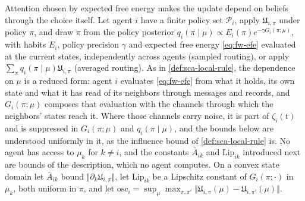 Attention chosen by expected free energy makes the update depend on beliefs through the choice itself. Let agent $i$ have a finite policy set $\mathcal P_i$, apply $\mathfrak U_{i,\pi}$ under policy $\pi$, and draw $\pi$ from the policy posterior $q_i(\pi\mid\mu)\propto E_i(\pi)e^{-\gamma G_i(\pi;\mu)}$, with habits $E_i$, policy precision $\gamma$ and expected free energy \eqref{eq:fw-efe} evaluated at the current states, independently across agents (sampled routing), or apply $\sum_\pi q_i(\pi\mid\mu)\mathfrak U_{i,\pi}$ (averaged routing). As in \cref{def:sca-local-rule}, the dependence on $\mu$ is a reduced form: agent $i$ evaluates \eqref{eq:fw-efe} from what it holds, its own state and what it has read of its neighbors through messages and records, and $G_i(\pi;\mu)$ composes that evaluation with the channels through which the neighbors' states reach it. Where those channels carry noise, it is part of $\zeta_i(t)$ and is suppressed in $G_i(\pi;\mu)$ and $q_i(\pi\mid\mu)$, and the bounds below are understood uniformly in it, as the influence bound of \cref{def:sca-local-rule} is. No agent has access to $\mu_k$ for $k\neq i$, and the constants $\bar A_{ik}$ and $\mathrm{Lip}_{ik}$ introduced next are bounds of the description, which no agent computes. On a convex state domain let $\bar A_{ik}$ bound $\Vert\partial_k\mathfrak U_{i,\pi}\Vert$, let $\mathrm{Lip}_{ik}$ be a Lipschitz constant of $G_i(\pi;\cdot)$ in $\mu_k$, both uniform in $\pi$, and let $\mathrm{osc}_i=\sup_\mu\max_{\pi,\pi'}\Vert\mathfrak U_{i,\pi}(\mu)-\mathfrak U_{i,\pi'}(\mu)\Vert$.

